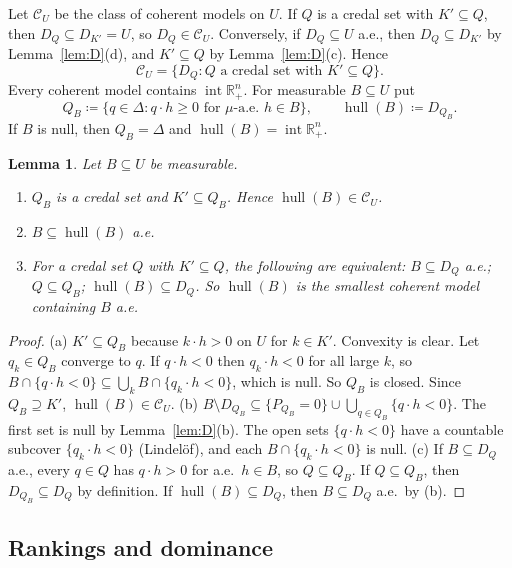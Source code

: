 \documentclass[11pt]{article}
\newcommand{\R}{\mathbb{R}}
\newcommand{\CC}{\mathcal{C}}
\newcommand{\hull}{\operatorname{hull}}
\newcommand{\Rpp}{\inter\R^n_{+}}
\DeclareMathOperator{\inter}{int}
\theoremstyle{plain}
\newtheorem{lemma}[theorem]{Lemma}
\theoremstyle{definition}
\theoremstyle{remark}
\begin{document}
\smallskip
Let $\CC_U$ be the class of coherent models on $U$. If $Q$ is a credal set with
$K'\subseteq Q$, then $D_Q\subseteq D_{K'}=U$, so $D_Q\in\CC_U$. Conversely, if $D_Q
\subseteq U$ a.e., then $D_Q\subseteq D_{K'}$ by Lemma~\ref{lem:D}(d), and $K'\subseteq
Q$ by Lemma~\ref{lem:D}(c). Hence
\[
  \CC_U=\{D_Q: Q\text{ a credal set with }K'\subseteq Q\}.
\]
Every coherent model contains $\Rpp$. For measurable $B\subseteq U$ put
\[
  Q_B\coloneqq\{q\in\Delta: q\cdot h\ge0\text{ for $\mu$-a.e.\ }h\in B\},\qquad
  \hull(B)\coloneqq D_{Q_B}.
\]
If $B$ is null, then $Q_B=\Delta$ and $\hull(B)=\Rpp$.

\begin{lemma}\label{lem:hull}
Let $B\subseteq U$ be measurable.
\begin{enumerate}[label=(\alph*)]
  \item $Q_B$ is a credal set and $K'\subseteq Q_B$. Hence $\hull(B)\in\CC_U$.
  \item $B\subseteq\hull(B)$ a.e.
  \item For a credal set $Q$ with $K'\subseteq Q$, the following are equivalent:
  $B\subseteq D_Q$ a.e.; $Q\subseteq Q_B$; $\hull(B)\subseteq D_Q$. So $\hull(B)$ is the
  smallest coherent model containing $B$ a.e.
\end{enumerate}
\end{lemma}

\begin{proof}
(a) $K'\subseteq Q_B$ because $k\cdot h>0$ on $U$ for $k\in K'$. Convexity is clear. Let
$q_k\in Q_B$ converge to $q$. If $q\cdot h<0$ then $q_k\cdot h<0$ for all large $k$, so
$B\cap\{q\cdot h<0\}\subseteq\bigcup_kB\cap\{q_k\cdot h<0\}$, which is null. So $Q_B$ is
closed. Since $Q_B\supseteq K'$, $\hull(B)\in\CC_U$.
(b) $B\setminus D_{Q_B}\subseteq\{P_{Q_B}=0\}\cup\bigcup_{q\in Q_B}\{q\cdot h<0\}$. The
first set is null by Lemma~\ref{lem:D}(b). The open sets $\{q\cdot h<0\}$ have a countable
subcover $\{q_k\cdot h<0\}$ (Lindel\"of), and each $B\cap\{q_k\cdot h<0\}$ is null.
(c) If $B\subseteq D_Q$ a.e., every $q\in Q$ has $q\cdot h>0$ for a.e.\ $h\in B$, so
$Q\subseteq Q_B$. If $Q\subseteq Q_B$, then $D_{Q_B}\subseteq D_Q$ by definition. If
$\hull(B)\subseteq D_Q$, then $B\subseteq D_Q$ a.e.\ by (b).
\end{proof}

\subsection{Rankings and dominance}
\end{document}
